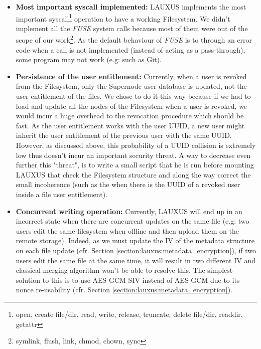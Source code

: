 \documentclass[../main.tex]{subfiles}
\begin{document}
\begin{itemize}
    \item \textbf{Most important syscall implemented:} LAUXUS implements the most important syscall\footnote{open, create file/dir, read, write, release, truncate, delete file/dir, readdir, getattr} operation to have a working Filesystem. We didn't implement all the \textit{FUSE} system calls because most of them were out of the scope of our work\footnote{symlink, flush, link, chmod, chown, sync}. As the default behaviour of \textit{FUSE} is to through an error code when a call is not implemented (instead of acting as a pass-through), some program may not work (e.g: such as Git).
    \item \textbf{Persistence of the user entitlement:} Currently, when a user is revoked from the Filesystem, only the Supernode user database is updated, not the user entitlement of the files. We chose to do it this way because if we had to load and update all the nodes of the Filesystem when a user is revoked, we would incur a huge overhead to the revocation procedure which should be fast. As the user entitlement works with the user UUID, a new user might inherit the user entitlement of the previous user with the same UUID. However, as discussed above, this probability of a UUID collision is extremely low thus doesn't incur an important security threat. A way to decrease even further this "threat", is to write a small script that he is run before mounting LAUXUS that check the Filesystem structure and along the way correct the small incoherence (such as the when there is the UUID of a revoked user inside a file user entitlement).
    \item \textbf{Concurrent writing operation:} Currently, LAUXUS will end up in an incorrect state when there are concurrent updates on the same file (e.g: two users edit the same filesystem when offline and then upload them on the remote storage). Indeed, as we must update the IV of the metadata structure on each file update (cfr. Section \ref{section:lauxus:metadata_encryption}), if two users edit the same file at the same time, it will result in two different IV and classical merging algorithm won't be able to resolve this. The simplest solution to this is to use AES GCM SIV instead of AES GCM due to its nonce re-usability (cfr. Section \ref{section:lauxus:metadata_encryption}).
\end{itemize}
\end{document}
